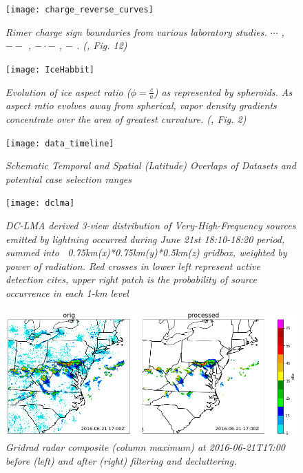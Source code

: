 \begin{figure}[H]
\centering
\texttt{[image: charge\_reverse\_curves]}
\singlespacing
\caption{\textit{Rimer charge sign boundaries from various laboratory studies. $\cdots$ \cite{takahashi1978riming}, $--$ \cite{saunders1998laboratory}, $-\cdot-$ \cite{pereyra2000laboratory}, $-$ \cite{saunders2006laboratory}. (\cite{saunders2008charge}, Fig. 12)}}
\label{fig:ChargeSign}
\end{figure}

\begin{figure}[H]
\vspace{40pt}
\centering
\texttt{[image: IceHabbit]}
\singlespacing
\caption{\textit{Evolution of ice aspect ratio ($\phi=\frac{c}{a}$) as represented by spheroids. As aspect ratio evolves away from spherical, vapor density gradients concentrate over the area of greatest curvature. (\cite{harrington2013methoda}, Fig. 2)}}
\label{fig:icehabit}
\end{figure}

\begin{figure}[H]
\vspace{-20pt}
\centering
\texttt{[image: data\_timeline]}
\singlespacing
\caption{\textit{Schematic Temporal and Spatial (Latitude) Overlaps of Datasets and potential case selection ranges}}
\label{fig:data_timeline}
\end{figure}

\begin{figure}[H]
\vspace{-10pt}
\centering
\texttt{[image: dclma]}
\singlespacing
\caption{\textit{DC-LMA derived 3-view distribution of Very-High-Frequency sources emitted by lightning occurred during June 21st 18:10-18:20 period, summed into ~0.75km(x)*0.75km(y)*0.5km(z) gridbox, weighted by power of radiation. Red crosses in lower left represent active detection cites, upper right patch is the probability of source occurrence in each 1-km level}}
\label{fig:dclma}
\end{figure}

\begin{figure}[H]
\vspace{40pt}
\centering
\includegraphics[width=\textwidth]{gridrad_compare}
\singlespacing
\caption{\textit{Gridrad radar composite (column maximum) at 2016-06-21T17:00 before (left) and after (right) filtering and decluttering.}}
\label{fig:gridrad_compare}
\end{figure}

